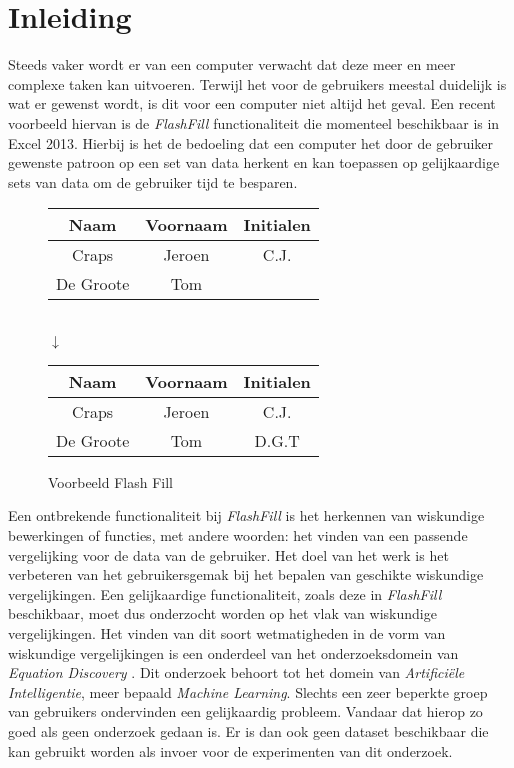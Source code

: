 \documentclass[Main.tex]{subfiles}
\begin{document}
\section{Inleiding}
Steeds vaker wordt er van een computer verwacht dat deze meer en meer complexe taken kan uitvoeren. Terwijl het voor de gebruikers meestal duidelijk is wat er gewenst wordt, is dit voor een computer niet altijd het geval. Een recent voorbeeld hiervan is de \textit{FlashFill} \cite{flashFill} functionaliteit die momenteel beschikbaar is in Excel 2013. Hierbij is het de bedoeling dat een computer het door de gebruiker gewenste patroon op een set van data herkent en kan toepassen op gelijkaardige sets van data om de gebruiker tijd te besparen.

\begin{figure}[!htb]
\centering
\begin{framed}
\begin{tabular}{| c | c | c |}
\hline
Naam & Voornaam & Initialen \\ \hline
Craps & Jeroen & C.J. \\ \hline
De Groote & Tom &  \\ \hline
\end{tabular} \\
$\downarrow$ \\
\begin{tabular}{| c | c | c |}
\hline
Naam & Voornaam & Initialen \\ \hline
Craps & Jeroen & C.J. \\ \hline
De Groote & Tom &  D.G.T \\ \hline
\end{tabular}
\end{framed}
\caption{Voorbeeld Flash Fill}
\label{fig:flashfill}
\end{figure}

\par Een ontbrekende functionaliteit bij \textit{FlashFill} is het herkennen van wiskundige bewerkingen of functies, met andere woorden: het vinden van een passende vergelijking voor de data van de gebruiker. Het doel van het werk is het verbeteren van het gebruikersgemak bij het bepalen van geschikte wiskundige vergelijkingen. Een gelijkaardige functionaliteit, zoals deze in \textit{FlashFill}  beschikbaar, moet dus onderzocht worden op het vlak van wiskundige vergelijkingen. Het vinden van dit soort wetmatigheden in de vorm van wiskundige vergelijkingen is een onderdeel van het onderzoeksdomein van \textit{Equation Discovery} \cite{equationDisc}. Dit onderzoek behoort tot het domein van \textit{Artifici\"ele Intelligentie}, meer bepaald \textit{Machine Learning}. Slechts een zeer beperkte groep van gebruikers ondervinden een gelijkaardig probleem. Vandaar dat hierop zo goed als geen onderzoek gedaan is. Er is dan ook geen dataset beschikbaar die kan gebruikt worden als invoer voor de experimenten van dit onderzoek.  \par
\end{document}
